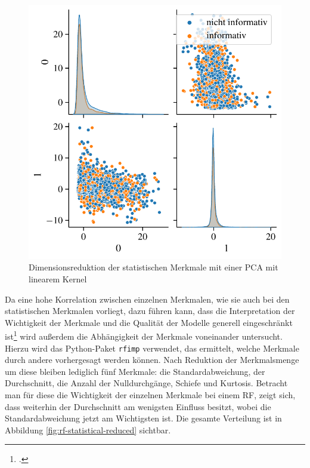  \begin{figure}[H]
 	\centering
 	\includegraphics[scale=0.85]{pic/statistical-pca-lin.pdf}
	\caption{Dimensionsreduktion der statistischen Merkmale mit einer \ac{PCA} mit linearem Kernel}
	\label{fig:dim-red-statistical}
\end{figure}

Da eine hohe Korrelation zwischen einzelnen Merkmalen, wie sie auch bei den statistischen Merkmalen vorliegt, dazu führen kann, dass die Interpretation der Wichtigkeit der Merkmale und die Qualität der Modelle generell eingeschränkt ist\footcite[Kapitel 8]{Harrison2019} wird außerdem die Abhängigkeit der Merkmale voneinander untersucht. Hierzu wird das Python-Paket \texttt{rfimp} verwendet, das ermittelt, welche Merkmale durch andere vorhergesagt werden können. Nach Reduktion der Merkmalsmenge um diese bleiben lediglich fünf Merkmale: die Standardabweichung, der Durchschnitt, die Anzahl der Nulldurchgänge, Schiefe und Kurtosis. Betracht man für diese die Wichtigkeit der einzelnen Merkmale bei einem \acl{RF}, zeigt sich, dass weiterhin der Durchschnitt am wenigsten Einfluss besitzt, wobei die Standardabweichung jetzt am Wichtigsten ist. Die gesamte Verteilung ist in Abbildung \ref{fig:rf-statistical-reduced} sichtbar.

